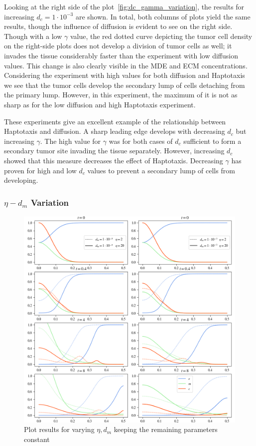 Looking at the right side of the plot~\ref{fig:dc_gamma_variation}, the results for increasing $d_c=1\cdot 10^{-3}$ are shown. In total, both columns of plots yield the same results, though the influence of diffusion is evident to see on the right side. Though with a low $\gamma$ value, the red dotted curve depicting the tumor cell density on the right-side plots does not develop a division of tumor cells as well; it invades the tissue considerably faster than the experiment with low diffusion values. This change is also clearly visible in the MDE and ECM concentrations. Considering the experiment with high values for both diffusion and Haptotaxis we see that the tumor cells develop the secondary lump of cells detaching from the primary lump. However, in this experiment, the maximum of it is not as sharp as for the low diffusion and high Haptotaxis experiment.

These experiments give an excellent example of the relationship between Haptotaxis and diffusion. A sharp leading edge develops with decreasing $d_c$ but increasing $\gamma$. The high value for $\gamma$ was for both cases of $d_c$ sufficient to form a secondary tumor site invading the tissue separately. However, increasing $d_c$ showed that this measure decreases the effect of Haptotaxis. Decreasing $\gamma$ has proven for high and low $d_c$ values to prevent a secondary lump of cells from developing. 

\subsubsection*{$\eta - d_m$ Variation}
\begin{figure}[h!]
 \centering
 \includegraphics[width=\textwidth]{resources/images/dm_eta_variation.png}
 \caption{Plot results for varying $\eta, d_m$ keeping the remaining parameters constant}
 \label{fig:dm_eta_variation}
\end{figure}

